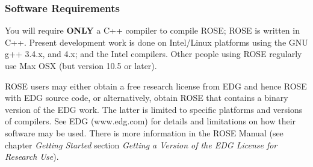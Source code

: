 \subsubsection{Software Requirements}
   You will require {\bf ONLY} a C++ compiler to compile ROSE; ROSE is written in C++.
Present development work is done on Intel/Linux platforms
using the GNU g++ 3.4.x, and 4.x; and the Intel compilers.  Other people using ROSE
regularly use Max OSX (but version 10.5 or later).

   ROSE users may either obtain a free research license from EDG and hence ROSE with EDG source code,
or alternatively, obtain ROSE that contains a binary version of the EDG work.
The latter is limited to specific platforms and versions of compilers. See EDG (www.edg.com) for details 
and limitations on how their software may be used. There is more information in the 
ROSE Manual (see chapter {\em Getting Started}
section {\em Getting a Version of the EDG License for Research Use}).


